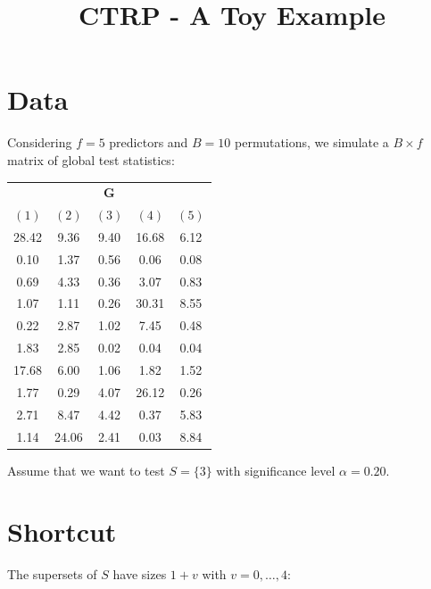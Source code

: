 \documentclass[11pt,a4paper,openright,twoside]{article}
\title{CTRP - A Toy Example}
\author{}
\date{}
\begin{document}
\maketitle

\section{Data}
Considering $f=5$ predictors and $B=10$ permutations, we simulate a $B\times f$ matrix of global test statistics:

\begin{table}[h!]
\centering
\begin{tabular}{ccccc}
\multicolumn{5}{c}{$\mathbf{G}$}\\
$(1)$ & $(2)$ & $(3)$ & $(4)$ & $(5)$\\
\cline{1-5}
28.42 & 9.36 & 9.40 & 16.68 & 6.12\\
0.10 & 1.37 & 0.56 & 0.06 & 0.08\\
0.69 & 4.33 & 0.36 & 3.07 & 0.83\\
1.07 & 1.11 & 0.26 & 30.31 & 8.55\\
0.22 & 2.87 & 1.02 & 7.45 & 0.48\\
1.83 & 2.85 & 0.02 & 0.04 & 0.04\\
17.68 & 6.00 & 1.06 & 1.82 & 1.52\\
1.77 & 0.29 & 4.07 & 26.12 & 0.26\\
2.71 & 8.47 & 4.42 & 0.37 & 5.83\\
1.14 & 24.06 & 2.41 & 0.03 & 8.84
\end{tabular}
\end{table}

Assume that we want to test $S=\{3\}$ with significance level $\alpha=0.20$.




\vspace{5mm}
\section{Shortcut}
The supersets of $S$ have sizes $1+v$ with $v=0,\ldots,4$:

\begin{table}[h!]
\centering
{}
\end{table}
\end{document}
